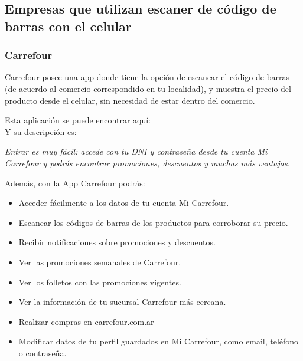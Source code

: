 \documentclass[twoside]{article}
\begin{document}
\subsection{Empresas que utilizan escaner de código de barras con el celular}
\subsubsection{Carrefour}
Carrefour posee una app donde tiene la opción de escanear el código de barras (de acuerdo al comercio correspondido en tu localidad), y muestra el precio del producto desde el celular, sin necesidad de estar dentro del comercio.

Esta aplicación se puede encontrar aquí: \cite{googleCarrefourArgentina} \\
Y su descripción es:\par
\textit{Entrar es muy fácil: accede con tu DNI y contraseña desde tu cuenta Mi Carrefour y podrás encontrar promociones, descuentos y muchas más ventajas.}

Además, con la App Carrefour podrás:
\begin{itemize}
    \item Acceder fácilmente a los datos de tu cuenta Mi Carrefour.
    \item Escanear los códigos de barras de los productos para corroborar su precio.
    \item Recibir notificaciones sobre promociones y descuentos.
    \item Ver las promociones semanales de Carrefour.
    \item Ver los folletos con las promociones vigentes.
    \item Ver la información de tu sucursal Carrefour más cercana.
    \item Realizar compras en carrefour.com.ar
    \item Modificar datos de tu perfil guardados en Mi Carrefour, como email, teléfono o contraseña.
\end{itemize}
\end{document}
